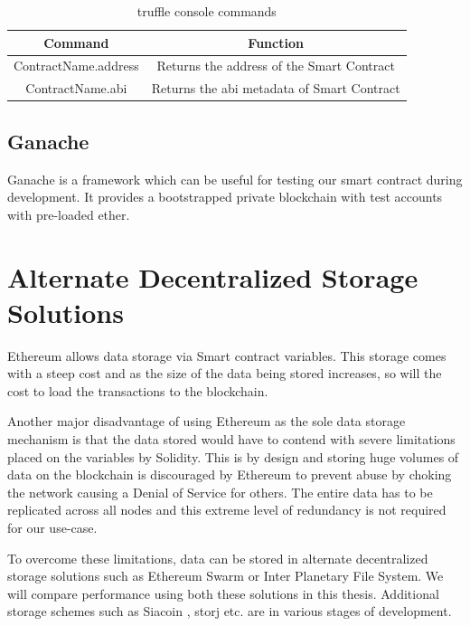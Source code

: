 \documentclass[11pt,openright]{report}
\begin{document}
\begin{table}[!htbp]
    \renewcommand{\arraystretch}{1.3}
    \caption{truffle console commands}
    \label{truffle_console}
    \centering
    \begin{tabular}{|c|c|}
        \hline
        \bfseries Command & \bfseries Function \\
        \hline\hline
        ContractName.address & Returns the address of the Smart Contract \\ \hline
        ContractName.abi & Returns the abi metadata of Smart Contract \\ \hline

    \end{tabular}
\end{table}

\subsection{Ganache}
Ganache is a framework which can be useful for testing our smart contract during development. It provides a bootstrapped private blockchain with test accounts with pre-loaded ether.

\section{Alternate Decentralized Storage Solutions}
Ethereum allows data storage via Smart contract variables. This storage comes with a steep cost and as the size of the data being stored increases, so will the cost to load the transactions to the blockchain.

Another major disadvantage of using Ethereum as the sole data storage mechanism is that the data stored would have to contend with severe limitations placed on the variables by Solidity. This is by design and storing huge volumes of data on the blockchain is discouraged by Ethereum to prevent abuse by choking the network causing a Denial of Service for others. The entire data has to be replicated across all nodes and this extreme level of redundancy is not required for our use-case.

To overcome these limitations, data can be stored in alternate decentralized storage solutions such as Ethereum Swarm or Inter Planetary File System. We will compare performance using both these solutions in this thesis. Additional storage schemes such as Siacoin \cite{vorick2014sia}, storj \cite{wilkinsonetal2014storj} etc. are in various stages of development.
\end{document}
